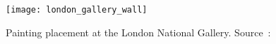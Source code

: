 \begin{figure}
    \texttt{[image: london\_gallery\_wall]}
    \caption[Painting placement at the London National Gallery]{Painting placement at the London National Gallery. Source~\cite{ScreenshotWallGoogle}:}
    \label{fig:london-wall}
\end{figure}




